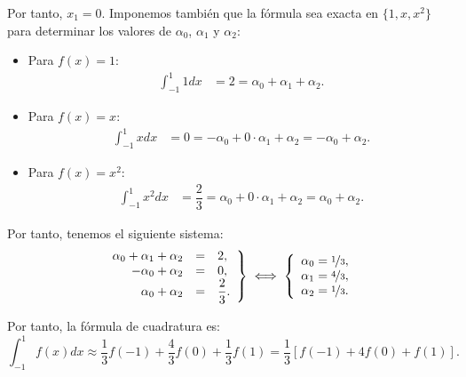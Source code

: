 \begin{ejercicio}
    Por tanto, $x_1 = 0$. Imponemos también que la fórmula sea exacta en $\{1,x,x^2\}$ para determinar los valores de $\alpha_0$, $\alpha_1$ y $\alpha_2$:
    \begin{itemize}
        \item Para $f(x) = 1$:
        \begin{align*}
            \int_{-1}^{1} 1 dx &= 2 = \alpha_0 + \alpha_1 + \alpha_2.
        \end{align*}
        \item Para $f(x) = x$:
        \begin{align*}
            \int_{-1}^{1} x dx &= 0 = -\alpha_0 + 0\cdot\alpha_1 + \alpha_2
            = -\alpha_0 + \alpha_2.
        \end{align*}
        \item Para $f(x) = x^2$:
        \begin{align*}
            \int_{-1}^{1} x^2 dx &= \dfrac{2}{3} = \alpha_0 + 0\cdot\alpha_1 + \alpha_2
            = \alpha_0 + \alpha_2.
        \end{align*}
    \end{itemize}

    Por tanto, tenemos el siguiente sistema:
    \begin{align*}
        \left.
        \begin{array}{rcl}
            \alpha_0 + \alpha_1 + \alpha_2 &=& 2,\\
            -\alpha_0 + \alpha_2 &=& 0,\\
            \alpha_0 + \alpha_2 &=& \dfrac{2}{3}.
        \end{array}
        \right\}
        \iff
        \left\{
        \begin{array}{rcl}
            \alpha_0 = \nicefrac{1}{3},\\
            \alpha_1 = \nicefrac{4}{3},\\
            \alpha_2 = \nicefrac{1}{3}.
        \end{array}
        \right.
    \end{align*}

    Por tanto, la fórmula de cuadratura es:
    \begin{equation*}
        \int_{-1}^{1} f(x) dx \approx \dfrac{1}{3}f(-1) + \dfrac{4}{3}f(0) + \dfrac{1}{3}f(1)
        = \dfrac{1}{3}\left[f(-1) + 4f(0) + f(1)\right].
    \end{equation*}


\end{ejercicio}
